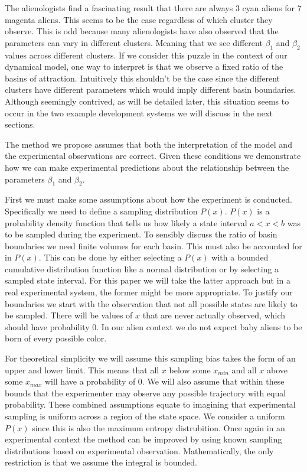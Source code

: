 \documentclass[letterpaper]{article}
\begin{document}
The alienologists find a fascinating result that there
are always 3 cyan aliens for 7 magenta aliens. This seems to be the case regardless
of which cluster they observe. This is odd because many alienologists have
also observed that the parameters can vary in different clusters. Meaning that we see 
different $\beta_1$ and $\beta_2$ values across different clusters.
If we consider this puzzle in the context of our dynamical
model, one way to interpret is that we observe a fixed ratio of the basins of
attraction. Intuitively this shouldn't be the case since the different
clusters have different parameters which would imply different basin boundaries. Although
seemingly contrived, as will be detailed later, this situation seems to occur in the two
example development systems we will discuss in the next sections.

The method we propose assumes that both the interpretation of the model and the experimental
observations are correct. Given these conditions we demonstrate 
how we can make experimental predictions about the relationship between the 
parameters $\beta_1$ and $\beta_2$.

First we must make some assumptions
about how the experiment is conducted. Specifically we need to define a sampling
distribution $P(x)$. $P(x)$ is a probability density function that 
tells us how likely a state interval $a<x<b$ was to be sampled during the experiment. 
To sensibly discuss the ratio of basin boundaries we need finite volumes for each basin.
This must also be accounted for in $P(x)$. This can be done by either selecting a $P(x)$
with a bounded cumulative distribution function like a normal distribution or by selecting
a sampled state interval. For this paper we will take the latter approach but in a real
experimental system, the former might be more appropriate. To justify our boundaries
we start with the observation that not all possible states are likely to be sampled.
There will be values of $x$ that are never actually observed, which should have probability 
0. In our alien context we
do not expect baby aliens to be born of every possible color. 

For theoretical simplicity
we will assume this sampling bias takes the form of an upper and lower limit. 
This means that all $x$
below some $x_{min}$ and all $x$ above some $x_{max}$ will have a probability of 0. 
We will also assume that within these bounds that the experimenter
may observe any possible trajectory with equal probability. These combined assumptions 
equate to imagining that experimental sampling is uniform across a region of the state 
space. We consider a uniform $P(x)$ since this is also the maximum entropy distrubition.
Once again in an experimental context the method can be improved
by using known sampling distributions based on experimental observation. Mathematically,
the only restriction is that we assume the integral is bounded. 
\end{document}
